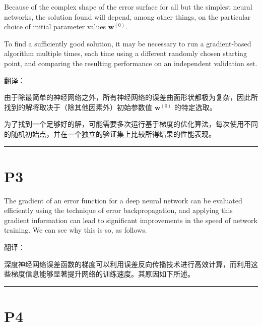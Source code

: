 \documentclass{article}
\begin{document}
Because of the complex shape of the error surface for all but the simplest neural networks, the solution found will depend, among other things, on the particular choice of initial parameter values $\mathbf{w}^{(0)}$. 

To find a sufficiently good solution, it may be necessary to run a gradient-based algorithm multiple times, each time using a different randomly chosen starting point, and comparing the resulting performance on an independent validation set.

{\color{red}
翻译：

由于除最简单的神经网络之外，所有神经网络的误差曲面形状都极为复杂，因此所找到的解将取决于（除其他因素外）初始参数值 $\mathbf{w}^{(0)}$ 的特定选取。

为了找到一个足够好的解，可能需要多次运行基于梯度的优化算法，每次使用不同的随机初始点，并在一个独立的验证集上比较所得结果的性能表现。
}

\noindent\rule{\linewidth}{0.4pt}

\section{P3}


The gradient of an error function for a deep neural network can be evaluated efficiently using the technique of error backpropagation, and applying this gradient information can lead to significant improvements in the speed of network training. We can see why this is so, as follows.

{\color{red}
翻译：

深度神经网络误差函数的梯度可以利用误差反向传播技术进行高效计算，而利用这些梯度信息能够显著提升网络的训练速度。其原因如下所述。

}

\noindent\rule{\linewidth}{0.4pt}

\section{P4}
\end{document}
